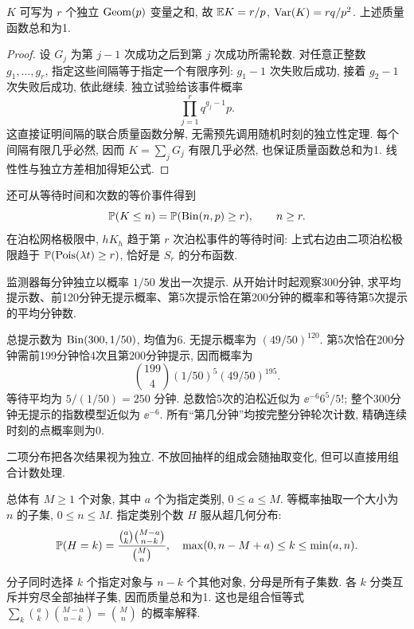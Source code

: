 \begin{proposition}
$K$ 可写为 $r$ 个独立 $\operatorname{Geom}(p)$ 变量之和, 故 $\mathbb E K=r/p$, $\operatorname{Var}(K)=rq/p^2$. 上述质量函数总和为1.
\end{proposition}
\begin{proof}
设 $G_j$ 为第 $j-1$ 次成功之后到第 $j$ 次成功所需轮数. 对任意正整数 $g_1,\ldots,g_r$, 指定这些间隔等于指定一个有限序列: $g_1-1$ 次失败后成功, 接着 $g_2-1$ 次失败后成功, 依此继续. 独立试验给该事件概率
\[
\prod_{j=1}^r q^{g_j-1}p.
\]
这直接证明间隔的联合质量函数分解, 无需预先调用随机时刻的独立性定理. 每个间隔有限几乎必然, 因而 $K=\sum_jG_j$ 有限几乎必然, 也保证质量函数总和为1. 线性性与独立方差相加得矩公式.
\end{proof}
还可从等待时间和次数的等价事件得到
\[
\mathbb P(K\le n)=\mathbb P(\operatorname{Bin}(n,p)\ge r),\qquad n\ge r.
\]
在泊松网格极限中, $hK_h$ 趋于第 $r$ 次泊松事件的等待时间: 上式右边由二项泊松极限趋于 $\mathbb P(\operatorname{Pois}(\lambda t)\ge r)$, 恰好是 $S_r$ 的分布函数.

\begin{example}
监测器每分钟独立以概率 $1/50$ 发出一次提示. 从开始计时起观察300分钟, 求平均提示数、前120分钟无提示概率、第5次提示恰在第200分钟的概率和等待第5次提示的平均分钟数.
\end{example}
\begin{solution}
总提示数为 $\operatorname{Bin}(300,1/50)$, 均值为6. 无提示概率为 $(49/50)^{120}$. 第5次恰在200分钟需前199分钟恰4次且第200分钟提示, 因而概率为
\[
\binom{199}{4}(1/50)^5(49/50)^{195}.
\]
等待平均为 $5/(1/50)=250$ 分钟. 总数恰5次的泊松近似为 $\ee^{-6}6^5/5!$; 整个300分钟无提示的指数模型近似为 $\ee^{-6}$. 所有“第几分钟”均按完整分钟轮次计数, 精确连续时刻的点概率则为0.
\end{solution}

二项分布把各次结果视为独立. 不放回抽样的组成会随抽取变化, 但可以直接用组合计数处理.
\begin{definition}
总体有 $M\ge1$ 个对象, 其中 $a$ 个为指定类别, $0\le a\le M$. 等概率抽取一个大小为 $n$ 的子集, $0\le n\le M$. 指定类别个数 $H$ 服从超几何分布:
\[
\mathbb P(H=k)=\frac{\binom ak\binom{M-a}{n-k}}{\binom Mn},
\quad \max(0,n-M+a)\le k\le\min(a,n).
\]
\end{definition}
分子同时选择 $k$ 个指定对象与 $n-k$ 个其他对象, 分母是所有子集数. 各 $k$ 分类互斥并穷尽全部抽样子集, 因而质量总和为1. 这也是组合恒等式
$\sum_k\binom ak\binom{M-a}{n-k}=\binom Mn$ 的概率解释.

